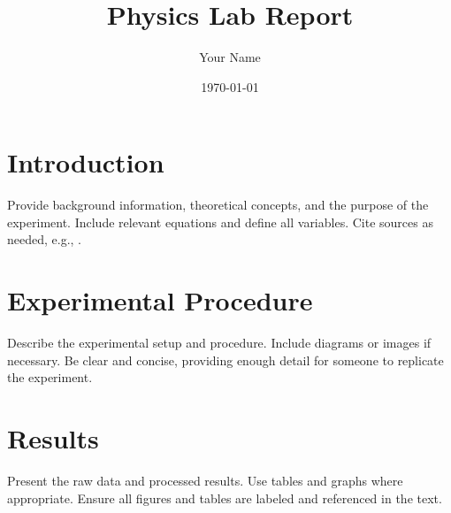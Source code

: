 \documentclass[a4paper,12pt]{article}
\title{Physics Lab Report}
\author{Your Name}
\date{\today}
\begin{document}
\maketitle
\newpage






\section{Introduction}
\label{sec:introduction}
Provide background information, theoretical concepts, and the purpose of the experiment. Include relevant equations and define all variables. Cite sources as needed, e.g., \autocite{example1}.

\section{Experimental Procedure}
\label{sec:procedure}
Describe the experimental setup and procedure. Include diagrams or images if necessary. Be clear and concise, providing enough detail for someone to replicate the experiment.

\section{Results}
\label{sec:results}
Present the raw data and processed results. Use tables and graphs where appropriate. Ensure all figures and tables are labeled and referenced in the text.
\end{document}
